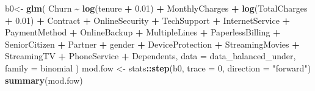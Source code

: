 \documentclass[
  twoside]{article}
\newenvironment{Shaded}{\begin{snugshade}}{\end{snugshade}}
\newcommand{\AttributeTok}[1]{\textcolor[rgb]{0.13,0.29,0.53}{#1}}
\newcommand{\DecValTok}[1]{\textcolor[rgb]{0.00,0.00,0.81}{#1}}
\newcommand{\FloatTok}[1]{\textcolor[rgb]{0.00,0.00,0.81}{#1}}
\newcommand{\FunctionTok}[1]{\textcolor[rgb]{0.13,0.29,0.53}{\textbf{#1}}}
\newcommand{\NormalTok}[1]{#1}
\newcommand{\OtherTok}[1]{\textcolor[rgb]{0.56,0.35,0.01}{#1}}
\newcommand{\SpecialCharTok}[1]{\textcolor[rgb]{0.81,0.36,0.00}{\textbf{#1}}}
\newcommand{\StringTok}[1]{\textcolor[rgb]{0.31,0.60,0.02}{#1}}
\begin{document}
\begin{Shaded}
\begin{Highlighting}[]
\NormalTok{b0}\OtherTok{\textless{}{-}} \FunctionTok{glm}\NormalTok{(}
\NormalTok{  Churn }\SpecialCharTok{\textasciitilde{}} \FunctionTok{log}\NormalTok{(tenure }\SpecialCharTok{+} \FloatTok{0.01}\NormalTok{)}
  \SpecialCharTok{+}\NormalTok{ MonthlyCharges}
  \SpecialCharTok{+} \FunctionTok{log}\NormalTok{(TotalCharges }\SpecialCharTok{+} \FloatTok{0.01}\NormalTok{)}
  \SpecialCharTok{+}\NormalTok{ Contract }\SpecialCharTok{+}\NormalTok{ OnlineSecurity }\SpecialCharTok{+}\NormalTok{ TechSupport }\SpecialCharTok{+}\NormalTok{ InternetService }\SpecialCharTok{+}\NormalTok{ PaymentMethod }
  \SpecialCharTok{+}\NormalTok{ OnlineBackup }\SpecialCharTok{+}\NormalTok{ MultipleLines }\SpecialCharTok{+}\NormalTok{ PaperlessBilling }\SpecialCharTok{+}\NormalTok{ SeniorCitizen }\SpecialCharTok{+}\NormalTok{ Partner }
  \SpecialCharTok{+}\NormalTok{ gender }\SpecialCharTok{+}\NormalTok{ DeviceProtection }\SpecialCharTok{+}\NormalTok{ StreamingMovies }\SpecialCharTok{+}\NormalTok{ StreamingTV }\SpecialCharTok{+}\NormalTok{ PhoneService }
  \SpecialCharTok{+}\NormalTok{ Dependents,}
  \AttributeTok{data =}\NormalTok{ data\_balanced\_under,}
  \AttributeTok{family =}\NormalTok{ binomial}
\NormalTok{)}
\NormalTok{mod.fow }\OtherTok{\textless{}{-}}\NormalTok{ stats}\SpecialCharTok{::}\FunctionTok{step}\NormalTok{(b0, }\AttributeTok{trace =} \DecValTok{0}\NormalTok{, }\AttributeTok{direction =} \StringTok{"forward"}\NormalTok{)}
\FunctionTok{summary}\NormalTok{(mod.fow)}
\end{Highlighting}
\end{Shaded}
\end{document}
